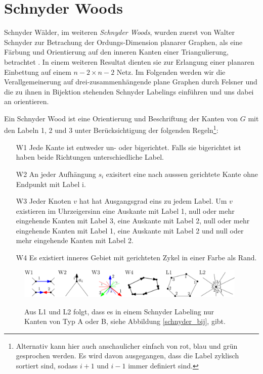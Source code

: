 \section{Schnyder Woods}\label{sw}
Schnyder Wälder, im weiteren \textit{Schnyder Woods}, wurden zuerst von Walter Schnyder zur Betrachung der Ordungs-Dimension planarer Graphen, als eine Färbung und Orientierung auf den inneren Kanten einer Triangulierung, betrachtet \cite{schnyder89}. In einem weiteren Resultat dienten sie zur Erlangung einer planaren Einbettung auf einem $n-2 \times n-2$ Netz\cite{schnyder90}. Im Folgenden werden wir die Verallgemeinerung auf drei-zusammenhängende plane Graphen durch Felsner \cite{felsner01} und die zu ihnen in Bijektion stehenden Schnyder Labelings einführen und uns dabei an \cite{fel12} orientieren.\\

\begin{definition}
Ein Schnyder Wood ist eine Orientierung und Beschriftung der Kanten von $G$ mit den Labeln 1, 2 und 3 unter Berücksichtigung der folgenden Regeln\footnote{Alternativ kann hier auch anschaulicher einfach von rot, blau und grün gesprochen werden. Es wird davon ausgegangen, dass die Label zyklisch sortiert sind, sodass $i+1$ und $i-1$ immer definiert sind.}:
\begin{itemize}
\item[W1] Jede Kante ist entweder un- oder bigerichtet. Falls sie bigerichtet ist haben beide Richtungen unterschiedliche Label.
\item[W2] An jeder Aufhängung  $s_i$ exisitert eine nach ausssen gerichtete Kante ohne Endpunkt mit Label i.  
\item[W3] Jeder Knoten $v$ hat hat Ausgangsgrad eins zu jedem Label. Um $v$ existieren im Uhrzeigersinn eine Auskante mit Label 1, null oder mehr eingehende Kanten mit Label 3, eine Auskante mit Label 2, null oder mehr  eingehende Kanten mit Label 1, eine Auskante mit Label 2 und null oder mehr  eingehende Kanten mit Label 2.
\item[W4] Es existiert inneres Gebiet mit gerichteten Zykel in einer Farbe als Rand.
\end{itemize}

\end{definition}

\begin{figure}[h]
	\centering
  \includegraphics[width=0.98\textwidth]{schnyder_wood_def.png}
	\label{10_example}
	\caption{Aus L1 und L2 folgt, dass es in einem Schnyder Labeling nur Kanten von Typ A oder B,  siehe Abbildung \ref{schnyder_bij}, gibt.}
\end{figure}

